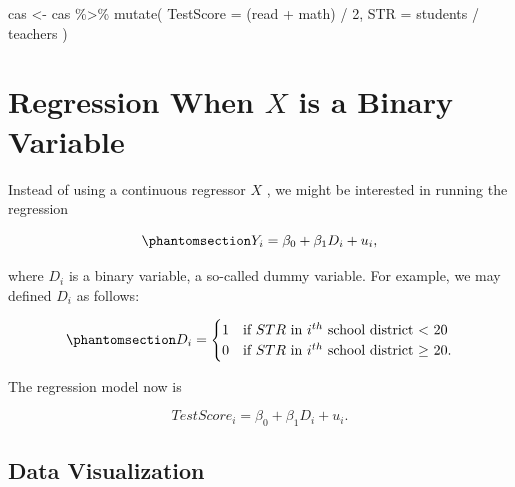 \documentclass[
  12pt,
  letterpaper,
]{scrbook}
\newenvironment{Shaded}{\begin{snugshade}}{\end{snugshade}}
\newcommand{\AttributeTok}[1]{\textcolor[rgb]{0.40,0.45,0.13}{#1}}
\newcommand{\CommentTok}[1]{\textcolor[rgb]{0.37,0.37,0.37}{#1}}
\newcommand{\DecValTok}[1]{\textcolor[rgb]{0.68,0.00,0.00}{#1}}
\newcommand{\FunctionTok}[1]{\textcolor[rgb]{0.28,0.35,0.67}{#1}}
\newcommand{\NormalTok}[1]{\textcolor[rgb]{0.00,0.23,0.31}{#1}}
\newcommand{\OtherTok}[1]{\textcolor[rgb]{0.00,0.23,0.31}{#1}}
\newcommand{\SpecialCharTok}[1]{\textcolor[rgb]{0.37,0.37,0.37}{#1}}
\theoremstyle{plain}
\theoremstyle{definition}
\theoremstyle{remark}
\begin{document}
\begin{Shaded}
\begin{Highlighting}[]
\NormalTok{cas }\OtherTok{\textless{}{-}}\NormalTok{ cas }\SpecialCharTok{\%\textgreater{}\%}
    \FunctionTok{mutate}\NormalTok{(}
        \AttributeTok{TestScore =}\NormalTok{ (read }\SpecialCharTok{+}\NormalTok{ math) }\SpecialCharTok{/} \DecValTok{2}\NormalTok{,}
        \AttributeTok{STR =}\NormalTok{ students }\SpecialCharTok{/}\NormalTok{ teachers}
\NormalTok{    )}
\end{Highlighting}
\end{Shaded}

\section{\texorpdfstring{Regression When \(X\) is a Binary
Variable}{Regression When X is a Binary Variable}}\label{regression-when-x-is-a-binary-variable}

Instead of using a continuous regressor \(X\) , we might be interested
in running the regression

\begin{equation}\phantomsection\label{eq-binary-regression}{
Y_i = \beta_0 + \beta_1 D_i + u_i, 
}\end{equation}

where \(D_i\) is a binary variable, a so-called dummy variable. For
example, we may defined \(D_i\) as follows:

\begin{equation}\phantomsection\label{eq-dummy-variable}{
D_i = 
\begin{cases}
    1 & \text{if $STR$ in $i^{th}$ school district < 20} \\
    0 & \text{if $STR$ in $i^{th}$ school district $\geq$ 20}.
\end{cases}
}\end{equation}

The regression model now is

\[
TestScore_i = \beta_0 + \beta_1 D_i + u_i.
\]

\subsection{Data Visualization}\label{data-visualization-1}

\begin{Shaded}
\end{Shaded}
\end{document}
